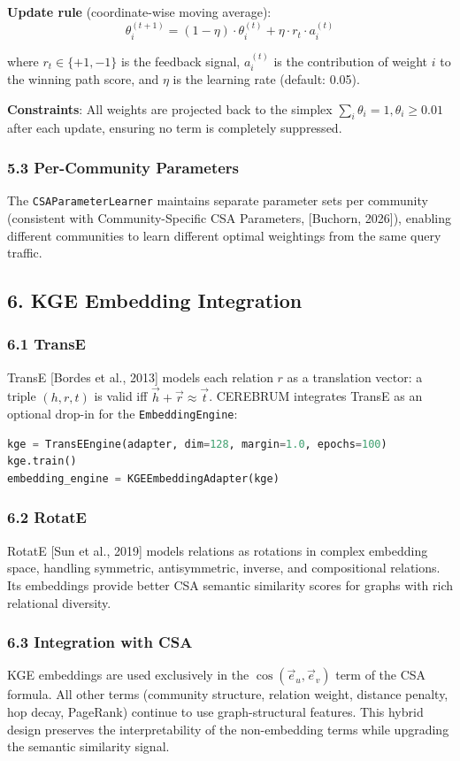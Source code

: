 \textbf{Update rule} (coordinate-wise moving average):
$$\theta_i^{(t+1)} = (1 - \eta) \cdot \theta_i^{(t)} + \eta \cdot r_t \cdot a_i^{(t)}$$

where $r_t \in \{+1, -1\}$ is the feedback signal, $a_i^{(t)}$ is the contribution of weight $i$ to the winning path score, and $\eta$ is the learning rate (default: 0.05).

\textbf{Constraints}: All weights are projected back to the simplex $\sum_i \theta_i = 1, \theta_i \geq 0.01$ after each update, ensuring no term is completely suppressed.

\subsubsection*{5.3 Per-Community Parameters}
The \texttt{CSAParameterLearner} maintains separate parameter sets per community (consistent with Community-Specific CSA Parameters, [Buchorn, 2026]), enabling different communities to learn different optimal weightings from the same query traffic.

\subsection*{6. KGE Embedding Integration}

\subsubsection*{6.1 TransE}
TransE [Bordes et al., 2013] models each relation $r$ as a translation vector: a triple $(h, r, t)$ is valid iff $\vec{h} + \vec{r} \approx \vec{t}$. CEREBRUM integrates TransE as an optional drop-in for the \texttt{EmbeddingEngine}:

\begin{lstlisting}[language=Python]
kge = TransEEngine(adapter, dim=128, margin=1.0, epochs=100)
kge.train()
embedding_engine = KGEEmbeddingAdapter(kge)
\end{lstlisting}

\subsubsection*{6.2 RotatE}
RotatE [Sun et al., 2019] models relations as rotations in complex embedding space, handling symmetric, antisymmetric, inverse, and compositional relations. Its embeddings provide better CSA semantic similarity scores for graphs with rich relational diversity.

\subsubsection*{6.3 Integration with CSA}
KGE embeddings are used exclusively in the $\cos(\vec{e}_u, \vec{e}_v)$ term of the CSA formula. All other terms (community structure, relation weight, distance penalty, hop decay, PageRank) continue to use graph-structural features. This hybrid design preserves the interpretability of the non-embedding terms while upgrading the semantic similarity signal.


